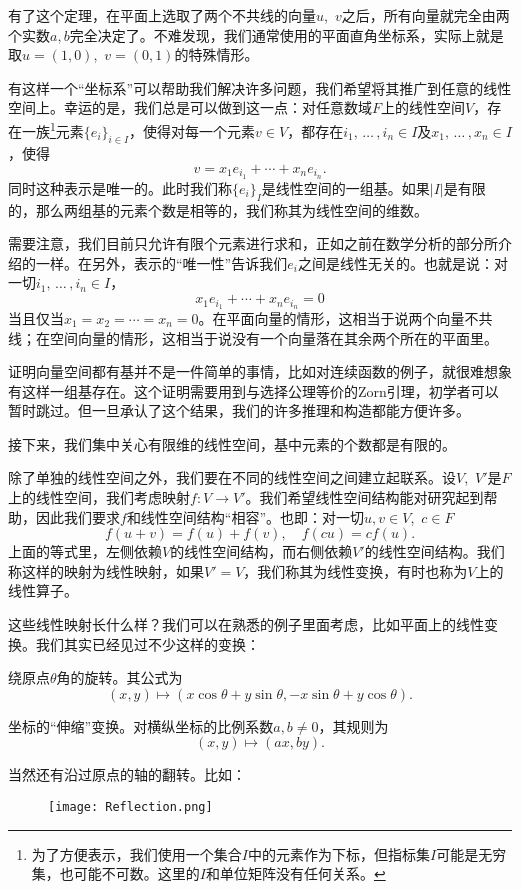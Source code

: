 有了这个定理，在平面上选取了两个不共线的向量$u$,~$v$之后，所有向量就完全由两个实数$a,b$完全决定了。不难发现，我们通常使用的平面直角坐标系，实际上就是取$u=(1,0)$,~$v=(0,1)$的特殊情形。

有这样一个“坐标系”可以帮助我们解决许多问题，我们希望将其推广到任意的线性空间上。幸运的是，我们总是可以做到这一点：对任意数域$F$上的线性空间$V$，存在一族\footnote{为了方便表示，我们使用一个集合$I$中的元素作为下标，但指标集$I$可能是无穷集，也可能不可数。这里的$I$和单位矩阵没有任何关系。}元素$\{e_i\}_{i\in I}$，使得对每一个元素$v\in V$，都存在$i_1,\,\dots\,,i_n\in I$及$x_1,\,\dots\,,x_n\in I$，使得
\[v=x_1e_{i_1}+\cdots +x_ne_{i_n}.\]
同时这种表示是唯一的。此时我们称$\{e_i\}_I$是线性空间的一组基。如果$|I|$是有限的，那么两组基的元素个数是相等的，我们称其为线性空间的维数。

需要注意，我们目前只允许有限个元素进行求和，正如之前在数学分析的部分所介绍的一样。在另外，表示的“唯一性”告诉我们$e_i$之间是线性无关的。也就是说：对一切$i_1,\,\dots\,,i_n\in I$，
\[x_1e_{i_1}+\cdots +x_ne_{i_n}=0\]
当且仅当$x_1=x_2=\cdots =x_n=0$。在平面向量的情形，这相当于说两个向量不共线；在空间向量的情形，这相当于说没有一个向量落在其余两个所在的平面里。

证明向量空间都有基并不是一件简单的事情，比如对连续函数的例子，就很难想象有这样一组基存在。这个证明需要用到与选择公理等价的Zorn引理，初学者可以暂时跳过。但一旦承认了这个结果，我们的许多推理和构造都能方便许多。

接下来，我们集中关心有限维的线性空间，基中元素的个数都是有限的。

除了单独的线性空间之外，我们要在不同的线性空间之间建立起联系。设$V$,~$V'$是$F$上的线性空间，我们考虑映射$f:V\to V'$。我们希望线性空间结构能对研究起到帮助，因此我们要求$f$和线性空间结构“相容”。也即：对一切$u,v\in V$,~$c\in F$
\[f(u+v)=f(u)+f(v),\quad f(cu)=cf(u).\]
上面的等式里，左侧依赖$V$的线性空间结构，而右侧依赖$V'$的线性空间结构。我们称这样的映射为线性映射，如果$V'=V$，我们称其为线性变换，有时也称为$V$上的线性算子。

这些线性映射长什么样？我们可以在熟悉的例子里面考虑，比如平面上的线性变换。我们其实已经见过不少这样的变换：

绕原点$\theta$角的旋转。其公式为
\[(x,y)\mapsto (x\cos\theta+y\sin \theta,-x\sin\theta+y\cos\theta).\]

坐标的“伸缩”变换。对横纵坐标的比例系数$a,b\neq 0$，其规则为
\[(x,y)\mapsto(ax, by).\]

当然还有沿过原点的轴的翻转。比如：
\begin{figure}[h]
    \centering
    \texttt{[image: Reflection.png]}
\end{figure}

